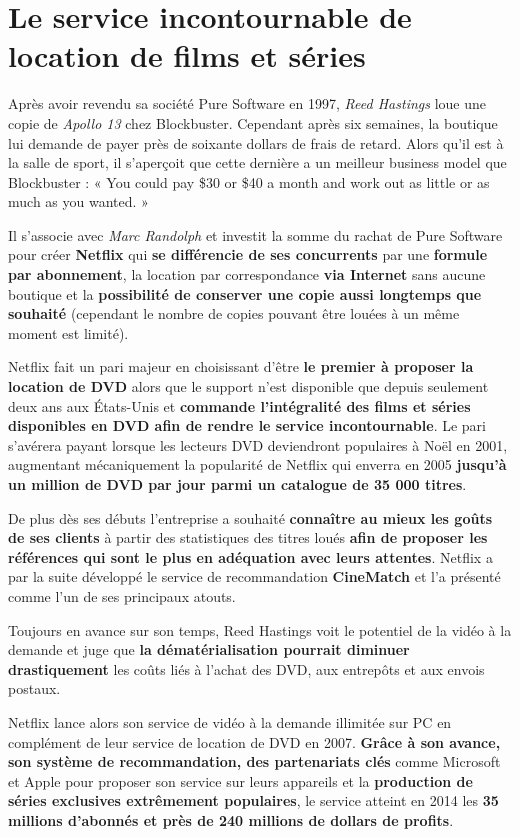 \section{Le service incontournable de location de films et séries}

Après avoir revendu sa société Pure Software en 1997, \textit{Reed Hastings} loue une copie de \textit{Apollo 13} chez Blockbuster. Cependant après six semaines, la boutique lui demande de payer près de soixante dollars de frais de retard. Alors qu'il est à la salle de sport, il s'aperçoit que cette dernière a un meilleur business model que Blockbuster : « You could pay \$30 or \$40 a month and work out as little or as much as you wanted. »\supercite{NetflixOrigins}

Il s'associe avec \textit{Marc Randolph} et investit la somme du rachat de Pure Software pour créer \textbf{Netflix} qui \textbf{se différencie de ses concurrents} par une \textbf{formule par abonnement}, la location par correspondance \textbf{via Internet} sans aucune boutique et la\textbf{ possibilité de conserver une copie aussi longtemps que souhaité} (cependant le nombre de copies pouvant être louées à un même moment est limité). 

\vspace{5mm}

Netflix fait un pari majeur en choisissant d'être \textbf{le premier à proposer la location de DVD} alors que le support n'est disponible que depuis seulement deux ans aux États-Unis et \textbf{commande l'intégralité des films et séries disponibles en DVD afin de rendre le service incontournable}\supercite{NetflixHistory}. Le pari s'avérera payant lorsque les lecteurs DVD deviendront populaires à Noël en 2001\supercite{BBC_DVD}, augmentant mécaniquement la popularité de Netflix qui enverra en 2005 \textbf{jusqu'à un million de DVD par jour parmi un catalogue de 35 000 titres}\supercite{NetflixHistory}.

De plus dès ses débuts l'entreprise a souhaité \textbf{connaître au mieux les goûts de ses clients} à partir des statistiques des titres loués \textbf{afin de proposer les références qui sont le plus en adéquation avec leurs attentes}. Netflix a par la suite développé le service de recommandation \textbf{CineMatch} et l'a présenté comme l'un de ses principaux atouts.

\vspace{5mm}

Toujours en avance sur son temps, Reed Hastings voit le potentiel de la vidéo à la demande et juge que \textbf{la dématérialisation pourrait diminuer drastiquement} les coûts liés à l'achat des DVD, aux entrepôts et aux envois postaux.

Netflix lance alors son service de vidéo à la demande illimitée sur PC en complément de leur service de location de DVD en 2007. \textbf{Grâce à son avance, son système de recommandation, des partenariats clés} comme Microsoft et Apple pour proposer son service sur leurs appareils et la \textbf{production de séries exclusives extrêmement populaires}, le service atteint en 2014 les \textbf{35 millions d'abonnés et près de 240 millions de dollars de profits}\supercite{NetflixDVDBloomberg}.